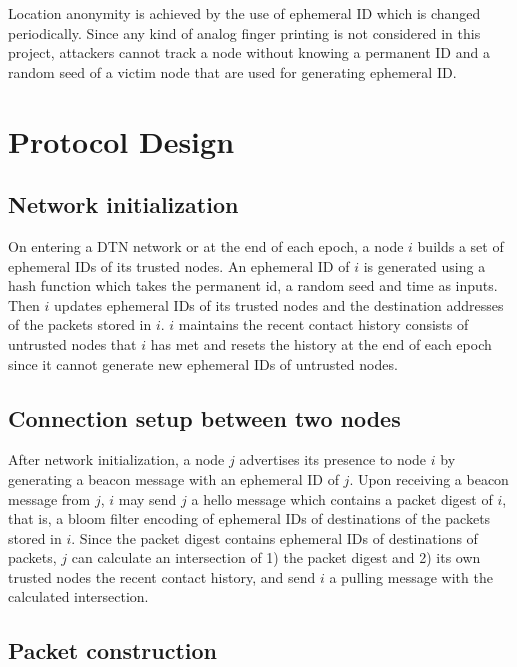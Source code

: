 \documentclass[11pt]{article}
\begin{document}
Location anonymity is achieved by the use of ephemeral ID which is changed periodically.  Since any kind of analog finger printing is not considered in this project, attackers cannot track a node without knowing a permanent ID and a random seed of a victim node that are used for generating ephemeral ID. 


\section{Protocol Design}

\subsection{Network initialization}

On entering a DTN network or at the end of each epoch, a node $i$ builds a set of ephemeral IDs of its trusted nodes.
An ephemeral ID of $i$ is generated using a hash function which takes the permanent id, a random seed and time as inputs.
Then $i$ updates ephemeral IDs of its trusted nodes and the destination addresses of the packets stored in $i$. 
$i$ maintains the recent contact history consists of untrusted nodes that $i$ has met and resets the history at the end of each epoch since it cannot generate new ephemeral IDs of untrusted nodes.



\subsection{Connection setup between two nodes}


After network initialization, a node $j$ advertises its presence to node $i$ by generating a beacon message with an ephemeral ID of $j$.
Upon receiving a beacon message from $j$, $i$ may send $j$ a hello message which contains a packet digest of $i$, that is, a bloom filter encoding of ephemeral IDs of destinations of the packets stored in $i$.  
Since the packet digest contains ephemeral IDs of destinations of packets, $j$ can calculate an intersection of 1) the packet digest and 2) its own trusted nodes the recent contact history, and send $i$ a pulling message with the calculated intersection.



\subsection{Packet construction}
\end{document}
